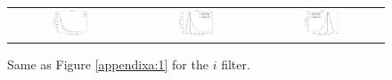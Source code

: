 \documentclass[preprintm,linenumbers]{aastex631}
\begin{document}
    \begin{figure}[h]
			\centering
			\begin{tabular}{c c c}
				
				\includegraphics[width=0.3\textwidth]{results/histograms_templates_tscale/hist_first_year_one_snap_v4_0_10yrs_db_noDD_noTwi_doALLTemplateMetrics_reduceNTemplate_i_noDD_noTwi.pdf} &
				\includegraphics[width=0.3\textwidth]{results/histograms_templates_tscale/hist_first_year_one_snap_v4_0_10yrs_db_noDD_noTwi_doALLTemplateMetrics_reduceSeeingTemplate_i_noDD_noTwi.pdf} &
				\includegraphics[width=0.3\textwidth]{results/histograms_templates_tscale/hist_first_year_one_snap_v4_0_10yrs_db_noDD_noTwi_doALLTemplateMetrics_reduceDepthTemplate_i_noDD_noTwi.pdf} \\
				
			\end{tabular}
			\caption{
				Same as Figure \ref{appendixa:1} for the $i$ filter.  \label{appendixa:4}
			}
		\end{figure}
\end{document}
